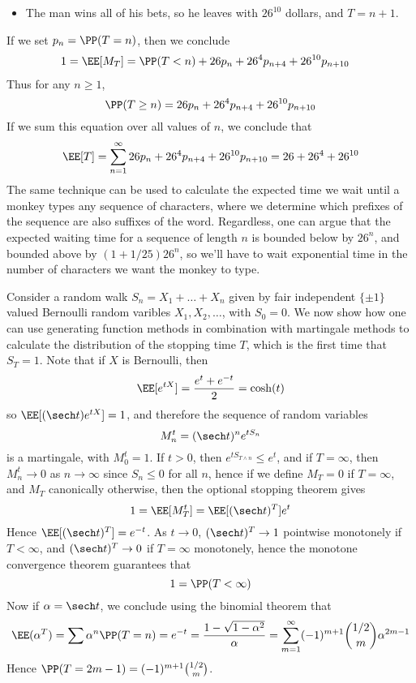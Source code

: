 \begin{example}
\begin{itemize}
        \item The man wins all of his bets, so he leaves with $26^{10}$ dollars, and $T = n + 1$.
    \end{itemize}
    If we set $p_n = \PP(T = n)$, then we conclude
    \begin{align*}
        1 = \EE[M_T] &= \PP(T < n) + 26p_n + 26^4p_{n+4} + 26^{10}p_{n+10}
    \end{align*}
    Thus for any $n \geq 1$,
    \[ \PP(T \geq n) = 26p_n + 26^4 p_{n+4} + 26^{10} p_{n + 10} \]
    If we sum this equation over all values of $n$, we conclude that
    \[ \EE[T] = \sum_{n = 1}^\infty 26p_n + 26^4 p_{n+4} + 26^{10} p_{n+10} = 26 + 26^4 + 26^{10} \]
    The same technique can be used to calculate the expected time we wait until a monkey types any sequence of characters, where we determine which prefixes of the sequence are also suffixes of the word. Regardless, one can argue that the expected waiting time for a sequence of length $n$ is bounded below by $26^n$, and bounded above by $(1 + 1/25)26^n$, so we'll have to wait exponential time in the number of characters we want the monkey to type.
\end{example}

\begin{example}
    Consider a random walk $S_n = X_1 + \dots + X_n$ given by fair independent $\{ \pm 1 \}$ valued Bernoulli random varibles $X_1, X_2, \dots$, with $S_0 = 0$. We now show how one can use generating function methods in combination with martingale methods to calculate the distribution of the stopping time $T$, which is the first time that $S_T = 1$. Note that if $X$ is Bernoulli, then
    \[ \EE[e^{tX}] = \frac{e^t + e^{-t}}{2} = \cosh(t) \]
    so $\EE[(\sech t) e^{tX}] = 1$, and therefore the sequence of random variables
    \[ M_n^t = (\sech t)^n e^{tS_n} \]
    is a martingale, with $M_0^t = 1$. If $t > 0$, then $e^{tS_{T \wedge n}} \leq e^t$, and if $T = \infty$, then $M_n^t \to 0$ as $n \to \infty$ since $S_n \leq 0$ for all $n$, hence if we define $M_T = 0$ if $T = \infty$, and $M_T$ canonically otherwise, then the optional stopping theorem gives
    \[ 1 = \EE[M_T^t] = \EE[(\sech t)^T] e^t \]
    Hence $\EE[(\sech t)^T] = e^{-t}$. As $t \to 0$, $(\sech t)^T \to 1$ pointwise monotonely if $T < \infty$, and $(\sech t)^T \to 0$ if $T = \infty$ monotonely, hence the monotone convergence theorem guarantees that
    \[ 1 = \PP(T < \infty) \]
    Now if $\alpha = \sech t$, we conclude using the binomial theorem that
    \[ \EE(\alpha^T) = \sum \alpha^n \PP(T = n) = e^{-t} = \frac{1 - \sqrt{1 - \alpha^2}}{\alpha} = \sum_{m = 1}^\infty (-1)^{m+1} {1/2 \choose m} \alpha^{2m-1} \]
    Hence $\PP(T = 2m - 1) = (-1)^{m+1} {1/2 \choose m}$.
\end{example}

